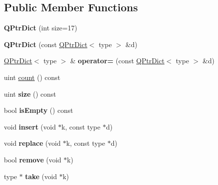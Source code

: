 \subsection*{Public Member Functions}
\begin{DoxyCompactItemize}
\item 
\mbox{\label{class_q_ptr_dict_a6dbf690e5fb7083fb2bb70a5b673aaf2}} 
{\bfseries Q\+Ptr\+Dict} (int size=17)
\item 
\mbox{\label{class_q_ptr_dict_a639ceaa1715d926e0c962bafb7443f22}} 
{\bfseries Q\+Ptr\+Dict} (const \mbox{\hyperlink{class_q_ptr_dict}{Q\+Ptr\+Dict}}$<$ type $>$ \&d)
\item 
\mbox{\label{class_q_ptr_dict_a3614d22bfa7f747e26f4e60c4e8d8196}} 
\mbox{\hyperlink{class_q_ptr_dict}{Q\+Ptr\+Dict}}$<$ type $>$ \& {\bfseries operator=} (const \mbox{\hyperlink{class_q_ptr_dict}{Q\+Ptr\+Dict}}$<$ type $>$ \&d)
\item 
uint \mbox{\hyperlink{class_q_ptr_dict_a05675b8aa91387dd5cbb74eb881e17d1}{count}} () const
\item 
\mbox{\label{class_q_ptr_dict_ac1b5ad00f2ffc28bb5edd6edad9e90fb}} 
uint {\bfseries size} () const
\item 
\mbox{\label{class_q_ptr_dict_a244c2535bd0df554eb891a464a717752}} 
bool {\bfseries is\+Empty} () const
\item 
\mbox{\label{class_q_ptr_dict_aea09cd919722fc6ec9934bc75cf5d3c0}} 
void {\bfseries insert} (void $\ast$k, const type $\ast$d)
\item 
\mbox{\label{class_q_ptr_dict_a29fcd4c7d0231b758b8a32f748cf2998}} 
void {\bfseries replace} (void $\ast$k, const type $\ast$d)
\item 
\mbox{\label{class_q_ptr_dict_a04d7a5fbb931195947fabc6c7aecbc7a}} 
bool {\bfseries remove} (void $\ast$k)
\item 
\mbox{\label{class_q_ptr_dict_a037c0e05801815de973c03be36c78257}} 
type $\ast$ {\bfseries take} (void $\ast$k)
\item 

\end{DoxyCompactItemize}
